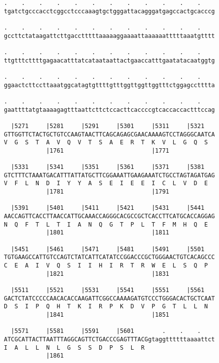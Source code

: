\documentclass{article}
\begin{document}
\begin{Verbatim}
.    .    .    .    .    .    .    .    .    .    .    .    
tgatctgcccacctcggcctcccaaagtgctgggattacagggatgagccactgcacccg
                                                            
.    .    .    .    .    .    .    .    .    .    .    .    
gccttctataagattcttgacctttttaaaaaggaaaattaaaaaatttttaaatgtttt
                                                            
.    .    .    .    .    .    .    .    .    .    .    .    
ttgtttcttttgagaacatttatcataataattactgaaccatttgaatatacaatggtg
                                                            
.    .    .    .    .    .    .    .    .    .    .    .    
ggaactcttccttaaatggcatagtgttttgtttggttggttggtttctggagcctttta
                                                            
.    .    .    .    .    .    .    .    .    .    .    .    
gaattttatgtaaaagagtttaattcttctccacttcaccccgtcaccaccactttccag
                                                            
  |5271     |5281     |5291     |5301     |5311     |5321   
GTTGGTTCTACTGCTGTCCAAGTAACTTCAGCAGAGCGAACAAAAGTCCTAGGGCAATCA
V  G  S  T  A  V  Q  V  T  S  A  E  R  T  K  V  L  G  Q  S  
            |1761                         |1771             
  
  |5331     |5341     |5351     |5361     |5371     |5381   
GTCTTTCTAAATGACATTTATTATGCTTCGGAAATTGAAGAAATCTGCCTAGTAGATGAG
V  F  L  N  D  I  Y  Y  A  S  E  I  E  E  I  C  L  V  D  E  
            |1781                         |1791             
  
  |5391     |5401     |5411     |5421     |5431     |5441   
AACCAGTTCACCTTAACCATTGCAAACCAGGGCACGCCGCTCACCTTCATGCACCAGGAG
N  Q  F  T  L  T  I  A  N  Q  G  T  P  L  T  F  M  H  Q  E  
            |1801                         |1811             
  
  |5451     |5461     |5471     |5481     |5491     |5501   
TGTGAAGCCATTGTCCAGTCTATCATTCATATCCGGACCCGCTGGGAACTGTCACAGCCC
C  E  A  I  V  Q  S  I  I  H  I  R  T  R  W  E  L  S  Q  P  
            |1821                         |1831             
  
  |5511     |5521     |5531     |5541     |5551     |5561   
GACTCTATCCCCCAACACACCAAGATTCGGCCAAAAGATGTCCCTGGGACACTGCTCAAT
D  S  I  P  Q  H  T  K  I  R  P  K  D  V  P  G  T  L  L  N  
            |1841                         |1851             
  
  |5571     |5581     |5591     |5601        .    .    .    
ATCGCATTACTTAATTTAGGCAGTTCTGACCCGAGTTTACGgtaggttttttaaaattct
I  A  L  L  N  L  G  S  S  D  P  S  L  R                    
            |1861                                           
  

\end{Verbatim}
\end{document}
